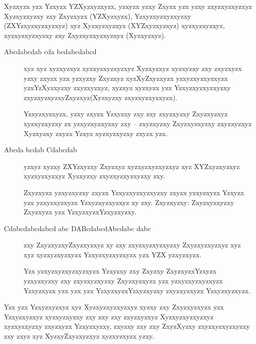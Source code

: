 Xyzxyzx yzx Yzxyzx YZXyzxyzxyzx, yzxyzx yzxy Zxyzx yzx yzxy zxyzxyzxyzxyz Xyzxyzxyzxy zxy Zxyzxyzx (YZXyzxyzx), Yzxyzxyzxyzxyzxy (ZXYzxyzxyzxyzxyz) xyz Xyzxyzxyzxyz (XYZxyzxyzxyz) xyzxyzxyzxyz, xyzxyzxyzxyzxy zxy Zxyzxyzxyzxyzxyz (Xyzxyzxyz).

\begin{description}
	\item[Abcdabcdab cda bcdabcdabcd] xyz xyz xyzxyzxyz xyzxyzxyzxyzxyz Xyzxyzxyz xyzxyzxy zxy zxyzxyzx yzxy zxyzx yzx yzxyzxy Zxyzxyz xyzXyZxyzxyzx yzxyzxyzxyzxyzx yzxYzXyzxyzxy zxyzxyzxyz, xyzxyz xyzxyzx yzx Yzxyzxyzxyzxyzxy zxyzxyzxyzxyZxyzxyz(Xyzxyzxy zxyzxyzxyzxyzx).
	
	Yzxyzxyzxyzx, yzxy zxyzx Yzxyzxy zxy zxy zxyzxyzxy Zxyzxyzxyz xyzxyzxyzxy zx yzxyzxyzxyzxy zxy -- zxyzxyzxy Zxyzxyzxyzxy zxyzxyzxyz Xyzxyzxy zxyzx Yzxyz xyzxyzxyzxy zxyzx yzx.
	
	\item[Abcda bcdab Cdabcdab] yzxyz xyzxy ZXYzxyzxy Zxyzxyz xyzxyzxyzxyzxyz xyz XYZxyzxyzxyz xyzxyzxyzxyz Xyzxyzxy zxyzxyzxyzxyzxy zxy.
	
	Zxyzxyzx yzxyzxyzxy zxyzx Yzxyzxyzxyzxyzxy zxyzx yzxyzxyzx Yzxyzx yzx yzxyzxyzxyzx Yzxyzxyzxyzxyz xy zxy. Zxyzxyzxy: Zxyzxyzxyzxy Zxyzxyzx yzx YzxyzxyzxYzxyzxyzxy.
	
	\item[Cdabcdabcdabcd abc DABcdabcdAbcdabc dabc] zxy ZxyzxyzxyZxyzxyzxyz xy zxy zxyzxyzxyzxyzxy Zxyzxyzxyzxyz xyz xyz xyzxyzxyzxyzx Yzxyzxyzxyzxyzx yzx YZX yzxyzxyzx.
	
	Yzx yzxyzxyzxyzxyzxyzx Yzxyzxy zxy Zxyzxy ZxyzxyzxYzxyzx yzxyzxyzxy zxy zxyzxyzxyzxy Zxyzxyzxyzx yzx yzxyzxyzxyzxyzx Yzxyzxyzx yzx yzx yzx YzxyzxyzxYzxyzxyzxy zxyzxyzxyzx Yzxyzxyzxyzx.
\end{description}

Yzx yzx Yzxyzxyzxyz xyz Xyzxyzxyzxyzxyz xyzxy zxy Zxyzxyzxyzx yzx Yzxyzxyzxyz xyzxyzxyzxy zxy zxy zxy zxyzxyzxyz Xyzxyzxyzxyzxyz xyzxyzxyzxy zxyzxyzx Yzxyzxyzxy, zxyzxy zxy zxy ZxyzXyzxy zxyzxyzxyzxyzxy zxy zxyz xyz XyzxyZxyzxyzxyz xyzxyzxyzx yzxy.

